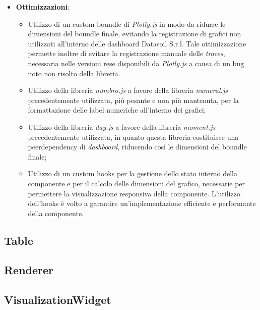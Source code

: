\begin{itemize}
\begin{listing}[H]
\begin{verbatim}
                  \end{verbatim}
                  \caption{Definizione delle props della componente Chart}
                  \label{listing:chartProps}
            \end{listing}
      \item \textbf{Ottimizzazioni}:
            \begin{itemize}
                  \item Utilizzo di un custom-boundle di \textit{Plotly.js} in modo da ridurre le dimensioni del boundle finale, evitando la registrazione
                        di grafici non utilizzati all'interno delle dashboard Datasoil S.r.l. Tale ottimizzazione permette inoltre di evitare la registrazione
                        manuale delle \textit{traces}, necessaria nelle versioni rese disponibili da \textit{Plotly.js} a causa di un bug noto non risolto della libreria.
                  \item Utilizzo della libreria \textit{numbro.js} a favore della libreria \textit{numeral.js} precedentemente utilizzata, più pesante e non più mantenuta,
                        per la formattazione delle label numeriche all'interno dei grafici;
                  \item Utilizzo della libreria \textit{day.js} a favore della libreria \textit{moment.js} precedentemente utilizzata, in quanto questa libreria costituisce una
                        peerdependency di \textit{dashboard}, riducendo così le dimensioni del boundle finale;
                  \item Utilizzo di un custom hooks per la gestione dello stato interno della componente e per il calcolo delle dimensioni del grafico, necessarie per permettere
                        la visualizzazione responsiva della componente. L'utilizzo dell'hooks è volto a garantire un'implementazione efficiente e performante della componente.
            \end{itemize}
\end{itemize}

\subsection{Table}

\subsection{Renderer}

\subsection{VisualizationWidget}
